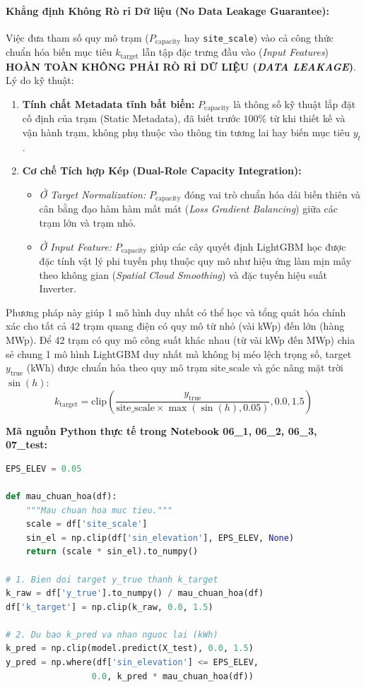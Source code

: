 \documentclass[12pt,a4paper]{article}
\begin{document}
\paragraph{Khẳng định Không Rò rỉ Dữ liệu (No Data Leakage Guarantee):}
Việc đưa tham số quy mô trạm ($P_{\text{capacity}}$ hay \texttt{site\_scale}) vào cả công thức chuẩn hóa biến mục tiêu $k_{\text{target}}$ lẫn tập đặc trưng đầu vào (\textit{Input Features}) \textbf{HOÀN TOÀN KHÔNG PHẢI RÒ RỈ DỮ LIỆU (\textit{DATA LEAKAGE})}. Lý do kỹ thuật:
\begin{enumerate}
    \item \textbf{Tính chất Metadata tĩnh bất biến:} $P_{\text{capacity}}$ là thông số kỹ thuật lắp đặt cố định của trạm (Static Metadata), đã biết trước $100\%$ từ khi thiết kế và vận hành trạm, không phụ thuộc vào thông tin tương lai hay biến mục tiêu $y_t$.
    \item \textbf{Cơ chế Tích hợp Kép (Dual-Role Capacity Integration):}
    \begin{itemize}
        \item \textit{Ở Target Normalization:} $P_{\text{capacity}}$ đóng vai trò chuẩn hóa dải biến thiên và cân bằng đạo hàm hàm mất mát (\textit{Loss Gradient Balancing}) giữa các trạm lớn và trạm nhỏ.
        \item \textit{Ở Input Feature:} $P_{\text{capacity}}$ giúp các cây quyết định LightGBM học được đặc tính vật lý phi tuyến phụ thuộc quy mô như hiệu ứng làm mịn mây theo không gian (\textit{Spatial Cloud Smoothing}) và đặc tuyến hiệu suất Inverter.
    \end{itemize}
\end{enumerate}

Phương pháp này giúp 1 mô hình duy nhất có thể học và tổng quát hóa chính xác cho tất cả 42 trạm quang điện có quy mô từ nhỏ (vài kWp) đến lớn (hàng MWp).
Để 42 trạm có quy mô công suất khác nhau (từ vài kWp đến MWp) chia sẻ chung 1 mô hình LightGBM duy nhất mà không bị méo lệch trọng số, target $y_{\text{true}}$ (kWh) được chuẩn hóa theo quy mô trạm $\text{site\_scale}$ và góc nâng mặt trời $\sin(h)$:
\begin{equation}
    k_{\text{target}} = \text{clip}\left(\frac{y_{\text{true}}}{\text{site\_scale} \times \max(\sin(h), 0.05)}, 0.0, 1.5\right)
\end{equation}

\textbf{Mã nguồn Python thực tế trong Notebook 06\_1, 06\_2, 06\_3, 07\_test:}
\begin{lstlisting}[language=Python]
EPS_ELEV = 0.05

def mau_chuan_hoa(df):
    """Mau chuan hoa muc tieu."""
    scale = df['site_scale']
    sin_el = np.clip(df['sin_elevation'], EPS_ELEV, None)
    return (scale * sin_el).to_numpy()

# 1. Bien doi target y_true thanh k_target
k_raw = df['y_true'].to_numpy() / mau_chuan_hoa(df)
df['k_target'] = np.clip(k_raw, 0.0, 1.5)

# 2. Du bao k_pred va nhan nguoc lai (kWh)
k_pred = np.clip(model.predict(X_test), 0.0, 1.5)
y_pred = np.where(df['sin_elevation'] <= EPS_ELEV, 
                 0.0, k_pred * mau_chuan_hoa(df))
\end{lstlisting}
\end{document}

